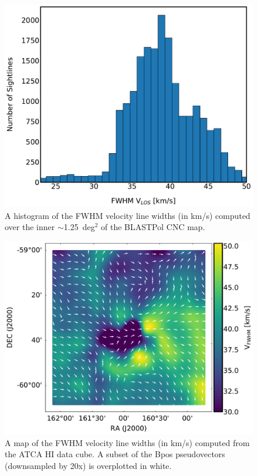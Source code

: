 \begin{figure}[!htbp]
\centering
\includegraphics[width=\textwidth]{figures/carina/VLOS_hist}
\caption[~A histogram of the FWHM velocity line widths computed over the inner  of the BLASTPol CNC map.]{A histogram of the FWHM velocity line widths (in km/s) computed over the inner $\sim$1.25~deg$^{2}$ of the BLASTPol CNC map.}
\label{fig:vfwhm_hist}
\end{figure}

\begin{figure}[!htbp]
\centering
\includegraphics[width=\textwidth]{figures/carina/VFWHM_vectors}
\caption[~A map of the FWHM velocity line widths computed from the ATCA HI data cube.]{A map of the FWHM velocity line widths (in km/s) computed from the ATCA $\mathrm{HI}$ data cube. A subset of the \gls{Bpos} pseudovectors (downsampled by 20x) is overplotted in white.}
\label{fig:vfwhm_map}
\end{figure}

